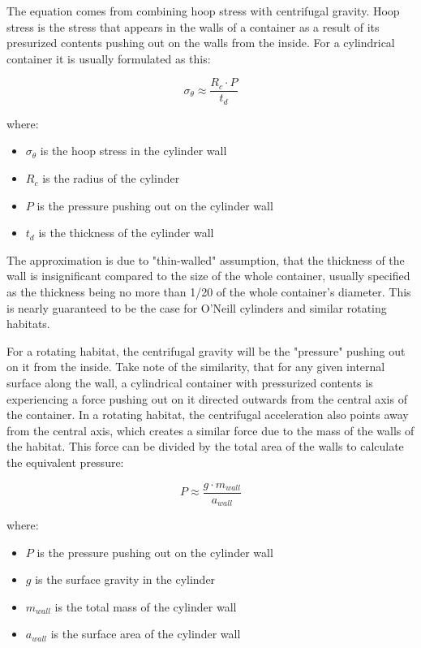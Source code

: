 \documentclass[a4paper]{article}
\begin{document}
	\pagebreak
	
	The equation comes from combining hoop stress with centrifugal gravity. Hoop stress is the stress that appears in the walls of a container as a result of its presurized contents pushing out on the walls from the inside. For a cylindrical container it is usually formulated as this:
	
	$$ \sigma_\theta \approx \frac{R_c \cdot P}{t_d} $$
	
	where:
	
	\begin{itemize}
		\item $\sigma_\theta$ is the hoop stress in the cylinder wall
		
		\item $R_c$ is the radius of the cylinder
		
		\item $P$ is the pressure pushing out on the cylinder wall
		
		\item $t_d$ is the thickness of the cylinder wall
	\end{itemize}
	
	The approximation is due to "thin-walled" assumption, that the thickness of the wall is insignificant compared to the size of the whole container, usually specified as the thickness being no more than 1/20 of the whole container's diameter. This is nearly guaranteed to be the case for O'Neill cylinders and similar rotating habitats.
	
	\medskip
	
	For a rotating habitat, the centrifugal gravity will be the "pressure" pushing out on it from the inside. Take note of the similarity, that for any given internal surface along the wall, a cylindrical container with pressurized contents is experiencing a force pushing out on it directed outwards from the central axis of the container. In a rotating habitat, the centrifugal acceleration also points away from the central axis, which creates a similar force due to the mass of the walls of the habitat. This force can be divided by the total area of the walls to calculate the equivalent pressure:
	
	$$ P \approx \frac{g \cdot m_{wall}}{a_{wall}} $$
	
	where:
	
	\begin{itemize}
		\item $P$ is the pressure pushing out on the cylinder wall
		
		\item $g$ is the surface gravity in the cylinder
		
		\item $m_{wall}$ is the total mass of the cylinder wall
		
		\item $a_{wall}$ is the surface area of the cylinder wall
	\end{itemize}
	
\end{document}

